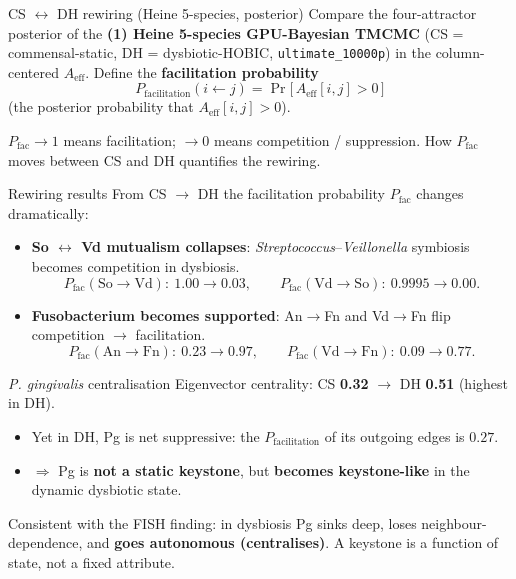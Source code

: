 \documentclass[
  ignorenonframetext,
  aspectratio=169,
]{beamer}
\providecommand{\tightlist}{%
  \setlength{\itemsep}{0pt}\setlength{\parskip}{0pt}}
\begin{document}
\begin{frame}[fragile]{CS \(\leftrightarrow\) DH rewiring (Heine
5-species, posterior)}
\protect\hypertarget{cs-leftrightarrow-dh-rewiring-heine-5-species-posterior}{}
Compare the four-attractor posterior of the \textbf{(1) Heine 5-species
GPU-Bayesian TMCMC} (CS = commensal-static, DH = dysbiotic-HOBIC,
\texttt{ultimate\_10000p}) in the column-centered \(A_{\text{eff}}\).
Define the \textbf{facilitation probability}
\[P_{\text{facilitation}}(i\!\leftarrow\! j) = \Pr\big[\,A_{\text{eff}}[i,j] > 0\,\big]\]
(the posterior probability that \(A_{\text{eff}}[i,j]>0\)).

\(P_{\text{fac}}\to 1\) means facilitation; \(\to 0\) means competition
/ suppression. How \(P_{\text{fac}}\) moves between CS and DH quantifies
the rewiring.
\end{frame}

\begin{frame}{Rewiring results}
\protect\hypertarget{rewiring-results}{}
From CS \(\to\) DH the facilitation probability \(P_{\text{fac}}\)
changes dramatically:

\begin{itemize}
\tightlist
\item
  \textbf{So \(\leftrightarrow\) Vd mutualism collapses}:
  \emph{Streptococcus}--\emph{Veillonella} symbiosis becomes competition
  in dysbiosis.
  \[P_{\text{fac}}(\text{So}\!\to\!\text{Vd}):\ 1.00 \to 0.03,\qquad
    P_{\text{fac}}(\text{Vd}\!\to\!\text{So}):\ 0.9995 \to 0.00.\]
\item
  \textbf{Fusobacterium becomes supported}: An\(\to\)Fn and Vd\(\to\)Fn
  flip competition \(\to\) facilitation.
  \[P_{\text{fac}}(\text{An}\!\to\!\text{Fn}):\ 0.23 \to 0.97,\qquad
    P_{\text{fac}}(\text{Vd}\!\to\!\text{Fn}):\ 0.09 \to 0.77.\]
\end{itemize}
\end{frame}

\begin{frame}{\emph{P. gingivalis} centralisation}
\protect\hypertarget{p.-gingivalis-centralisation}{}
Eigenvector centrality: CS \textbf{0.32} \(\to\) DH \textbf{0.51}
(highest in DH).

\begin{itemize}
\tightlist
\item
  Yet in DH, Pg is net suppressive: the \(P_{\text{facilitation}}\) of
  its outgoing edges is \(0.27\).
\item
  \(\Rightarrow\) Pg is \textbf{not a static keystone}, but
  \textbf{becomes keystone-like} in the dynamic dysbiotic state.
\end{itemize}

\vspace{0.3em}

Consistent with the FISH finding: in dysbiosis Pg sinks deep, loses
neighbour-dependence, and \textbf{goes autonomous (centralises)}. A
keystone is a function of state, not a fixed attribute.
\end{frame}
\end{document}
